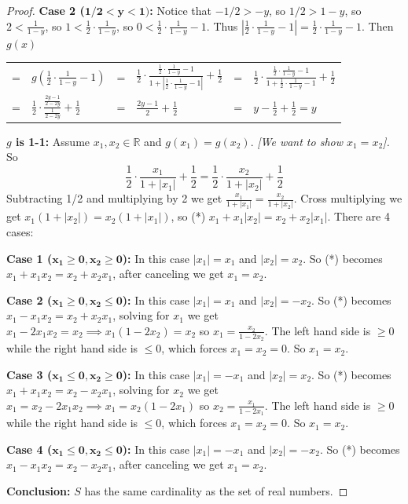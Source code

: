 \documentclass[14pt]{extarticle}
\newcommand{\dps}{\displaystyle}
\newcommand{\R}{\mathbb{R}}
\begin{document}
\begin{proof}
{\bf Case 2 (\(\bm{1/2 < y < 1})\):} Notice that \(-1/2 > -y\), so \(1/2 > 1-y\), so \(2 < \frac{1}{1-y}\), so \(1 < 
\frac{1}{2} \cdot \frac{1}{1-y}\), so \(0 < \frac{1}{2} \cdot \frac{1}{1-y} - 1\). Thus \(\left|\frac{1}{2} \cdot 
\frac{1}{1-y} - 1 \right| = \frac{1}{2} \cdot \frac{1}{1-y} - 1\). Then $g(x)$
\begin{center}
\begin{tabular}{llllll}
= & \(\dps g\left(\frac{1}{2} \cdot \frac{1}{1-y} - 1 \right)\) & = & \(\dps \frac{1}{2} \cdot \frac{\frac{1}{2} \cdot \frac{1}{1-y} - 1}{1 + \left|\frac{1}{2} \cdot \frac{1}{1-y} - 1 \right|} + \frac{1}{2}\) & = & \(\dps \frac{1}{2} \cdot \frac{\frac{1}{2} \cdot \frac{1}{1-y} - 1}{1 + \frac{1}{2} \cdot \frac{1}{1-y} - 1} + \frac{1}{2}\) \\ 
= & \(\dps \frac{1}{2} \cdot \frac{\frac{2y-1}{2-2y}}{\frac{1}{2-2y}} + \frac{1}{2}\) & = & \(\dps \frac{2y-1}
{2} + \frac{1}{2}\) & = & \(\dps y - \frac{1}{2} + \frac{1}{2} = y\)
\end{tabular}
\end{center}

{\bf $g$ is 1-1:} Assume \(x_1, x_2 \in \R\) and \(g(x_1) = g(x_2)\). {\it [We want to show \(x_1 = x_2\)].} So
\[
\frac{1}{2} \cdot \frac{x_1}{1 + |x_1|} + \frac{1}{2} = \frac{1}{2} \cdot \frac{x_2}{1 + |x_2|} + \frac{1}{2}
\]
Subtracting 1/2 and multiplying by 2 we get \(\dps \frac{x_1}{1 + |x_1|} = \frac{x_2}{1 + |x_2|}\). Cross
multiplying we get \(x_1(1+|x_2|) = x_2(1+|x_1|)\), so (*) \(x_1 + x_1|x_2| = x_2 + x_2|x_1|\). There are 4 cases:

{\bf Case 1 (\(\bm{x_1 \geq 0, x_2 \geq 0}\)):} In this case \(|x_1| = x_1\) and \(|x_2| = x_2\). So (*) becomes
\(x_1 + x_1x_2 = x_2 + x_2x_1\), after canceling we get \(x_1 = x_2\).

{\bf Case 2 (\(\bm{x_1 \geq 0, x_2 \leq 0}\)):} In this case \(|x_1| = x_1\) and \(|x_2| = -x_2\). So (*) becomes
\(x_1 - x_1x_2 = x_2 + x_2x_1\), solving for $x_1$ we get \(x_1 - 2x_1x_2 = x_2 \implies x_1(1-2x_2) = x_2\) so
\(\dps x_1 = \frac{x_2}{1-2x_2}\). The left hand side is \(\geq 0\) while the right hand side is \(\leq 0\), which
forces \(x_1 = x_2 = 0\). So \(x_1 = x_2\).

{\bf Case 3 (\(\bm{x_1 \leq 0, x_2 \geq 0}\)):} In this case \(|x_1| = -x_1\) and \(|x_2| = x_2\). So (*) becomes
\(x_1 + x_1x_2 = x_2 - x_2x_1\), solving for $x_2$ we get \(x_1 = x_2 - 2x_1x_2 \implies x_1 = x_2(1-2x_1)\) so
\(\dps x_2 = \frac{x_1}{1-2x_1}\). The left hand side is \(\geq 0\) while the right hand side is \(\leq 0\), which
forces \(x_1 = x_2 = 0\). So \(x_1 = x_2\).

{\bf Case 4 (\(\bm{x_1 \leq 0, x_2 \leq 0}\)):} In this case \(|x_1| = -x_1\) and \(|x_2| = -x_2\). So (*) becomes
\(x_1 - x_1x_2 = x_2 - x_2x_1\), after canceling we get \(x_1 = x_2\).

{\bf Conclusion:} $S$ has the same cardinality as the set of real numbers.
\end{proof}
\end{document}
